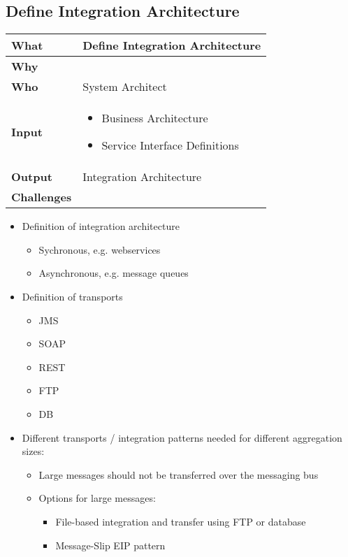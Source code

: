 \subsection{Define Integration Architecture}
\begin{minipage}{\textwidth}
 \label{table:ch6_Task_Define_Integration_Architecture}
\begin{tabular}
	{|m{3cm}|m{10cm}|} \hline \bfseries What & Define Integration Architecture\\
	\hline \bfseries Why & \\
	\hline \bfseries Who & System Architect\\
	\hline \bfseries Input & 
		\begin{itemize}
			\item Business Architecture
			\item Service Interface Definitions
		\end{itemize}
	\\
	\hline \bfseries Output & Integration Architecture\\
	\hline \bfseries Challenges & \\
	\hline 
\end{tabular}
\end{minipage}

\begin{itemize}
	\item Definition of integration architecture
	\begin{itemize}
		\item Sychronous, e.g. webservices
		\item Asynchronous, e.g. message queues
	\end{itemize}
	\item Definition of transports
	\begin{itemize}
		\item JMS
		\item SOAP
		\item REST
		\item FTP
		\item DB
	\end{itemize}
	\item Different transports / integration patterns needed for different aggregation sizes:
	\begin{itemize}
		\item Large messages should not be transferred over the messaging bus
		\item Options for large messages:
		\begin{itemize}
			\item File-based integration and transfer using FTP or database
			\item Message-Slip EIP pattern
		\end{itemize}
	\end{itemize}
\end{itemize}

